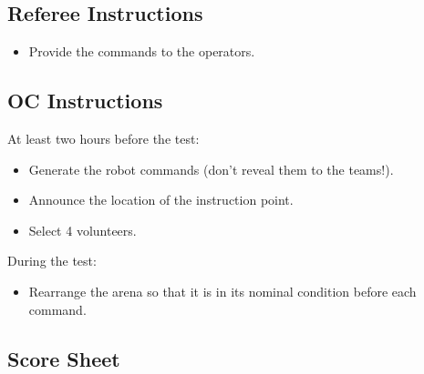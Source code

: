 \subsection*{Referee Instructions}
\begin{itemize}[nosep]
	\item Provide the commands to the operators.
\end{itemize}

\subsection*{OC Instructions}

At least two hours before the test:
\begin{itemize}[nosep]
	\item Generate the robot commands (don't reveal them to the teams!).
	\item Announce the location of the instruction point.
	\item Select 4 volunteers. 
\end{itemize}

\noindent During the test:
\begin{itemize}[nosep]
	\item Rearrange the arena so that it is in its nominal condition before each command.
\end{itemize}

\subsection*{Score Sheet}

\begin{scorelist}[timelimit=5]


\end{scorelist}

\clearpage
